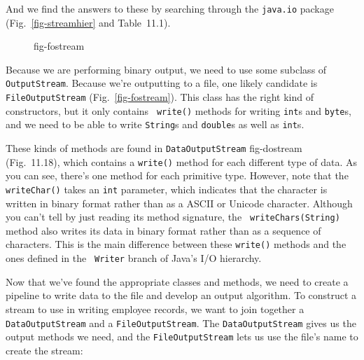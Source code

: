\noindent And we find the answers to these by searching through
the {\tt java.io} package (Fig.~\ref{fig-streamhier} and Table~11.1).

\begin{figure}[b]
 {fig-fostream}
\end{figure}

Because we are performing binary output, we need to use some subclass
of {\tt OutputStream}. Because we're outputting to a file, one likely
candidate is {\tt FileOutputStream} (Fig.~\ref{fig-fostream}). This
class has the right kind of constructors, but it only contains {\tt
write()} methods for writing {\tt int}s and {\tt byte}s, and
we need to be able to write {\tt String}s and {\tt double}s
as well as {\tt int}s.  

\pagebreak
These kinds of methods are found in {\tt DataOutputStream}
{fig-dostream}
(Fig.~11.18), which contains a {\tt write()} method for each
different type of data. As you can see, there's one method for each
primitive type.  However, note that the {\tt writeChar()} takes an
{\tt int} parameter, which indicates that the character is written in
binary format rather than as a ASCII or Unicode character.  Although
you can't tell by just reading its method signature, the {\tt
writeChars(String)} method also writes its data in binary format
rather than as a sequence of characters.  This is the main difference
between these {\tt write()} methods and the ones defined in the {\tt
Writer} branch of Java's I/O hierarchy.


Now that we've found the appropriate classes and methods,  we need to create
a pipeline to write data to the file and develop an output algorithm.
To construct a stream
to use in writing employee records, we want to join together a
{\tt DataOutputStream} and a {\tt FileOutputStream}. The
{\tt DataOutputStream} gives us the output methods we need, and the
{\tt FileOutputStream} lets us use the file's name to create the stream:

